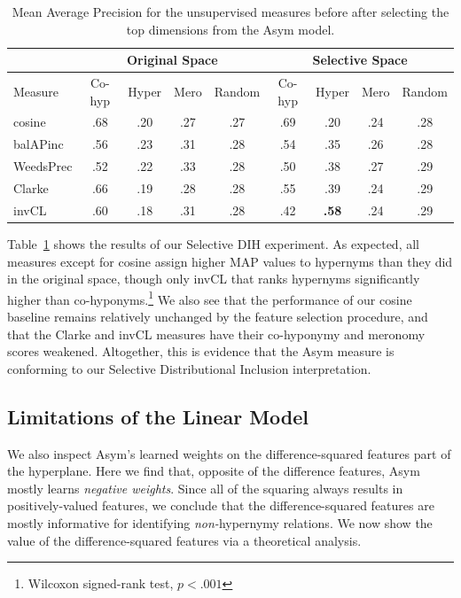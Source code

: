 \begin{table}
  \centering
  \begin{small}
  \begin{tabular}{|l|cccc||cccc|}
    \hline
    & \multicolumn{4}{c||}{Original Space} & \multicolumn{4}{|c|}{Selective Space}\\
    \hline\hline
    Measure        & Co-hyp  & Hyper  & Mero  & Random  & Co-hyp  &   Hyper  & Mero & Random \\
    \hline
    cosine         &   .68   &   .20  &  .27  &    .27  &    .69  &     .20  &  .24 &    .28 \\
    balAPinc       &   .56   &   .23  &  .31  &    .28  &    .54  &     .35  &  .26 &    .28 \\
    WeedsPrec      &   .52   &   .22  &  .33  &    .28  &    .50  &     .38  &  .27 &    .29 \\
    Clarke         &   .66   &   .19  &  .28  &    .28  &    .55  &     .39  &  .24 &    .29 \\
    invCL          &   .60   &   .18  &  .31  &    .28  &    .42  & {\bf.58} &  .24 &    .29 \\
    \hline
  \end{tabular}
  \end{small}
  \caption{Mean Average Precision for the unsupervised measures before
  after selecting the top dimensions from the Asym model.}
  \label{tab:mapscores2}
\end{table}

Table~\ref{tab:mapscores2} shows the results of our Selective DIH experiment.
As expected, all measures except for cosine assign higher MAP values to
hypernyms than they did in the original space, though only invCL that ranks
hypernyms significantly higher than co-hyponyms.\footnote{Wilcoxon signed-rank
test, $p < .001$} We also see that the performance of our cosine baseline
remains relatively unchanged by the feature selection procedure, and that
the Clarke and invCL measures have their co-hyponymy and meronomy
scores weakened. Altogether, this is evidence that the Asym measure is
conforming to our Selective Distributional Inclusion interpretation.

\subsection{Limitations of the Linear Model}
\label{sec:linearlimits}

We also inspect Asym's learned weights on the difference-squared features part
of the hyperplane. Here we find that, opposite of the difference features, Asym
mostly learns {\em negative weights}. Since all of the squaring always results
in positively-valued features, we conclude that the difference-squared features
are mostly informative for identifying {\em non-}hypernymy relations. We now
show the value of the difference-squared features via a theoretical analysis.

